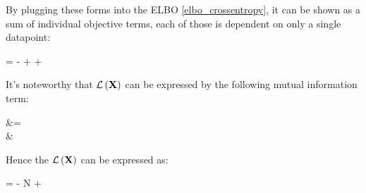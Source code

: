 By plugging these forms into the ELBO \eqref{elbo_crossentropy},
it can be shown as a sum of individual objective terms, each of those
is dependent on only a single datapoint:
\begin{nalign}
\elboX = \sumiN -\entropy{\qphizi,\pzi} + \entropy{\qphizi } + \expectqphizi{\log \pxicondi}
\end{nalign}

It's noteworthy that $\mathcal{L}\left(\mathbf{X}\right)$ can be expressed by the following mutual information term: 

\begin{nalign}
    \mutinf{\boldz}{\boldx} &= \expectx{\kl{\qphiz}{\pzonly}}\\
        & \approx {}\sumiN \kl{\qphizi}{\pzi}
\end{nalign}

Hence the $\mathcal{L}\left(\mathbf{X}\right)$ can be expressed as:

\begin{nalign}
\elboX = - N\cdot \mutinf{\boldz}{\boldx} + \sumiN \expectqphizi{\log \pxicondi}
\end{nalign}
